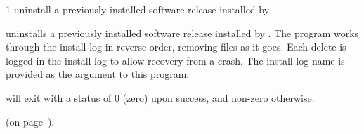 \begin{ManPage}{\label{man-cleanup-release}}{1}
{uninstall a previously installed software release installed by   } 

\Synopsis {}



\Description {} uninstalls a previously installed
software release installed by .  The program
works through the install log in reverse order, removing files as it goes.
Each delete is logged in the install log to allow recovery from a
crash.  The install log name is provided as the 
argument to this program.

\begin{Options}
\end{Options}

\ExitStatus
{} will exit with a status of 0 (zero) upon success,
and non-zero otherwise.

\SeeAlso
{} (on page~\pageref{man-install-release}).

\end{ManPage}
